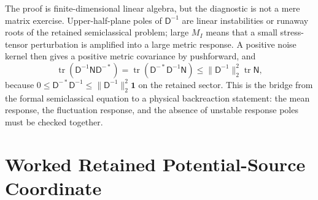 The proof is finite-dimensional linear algebra, but the diagnostic is not a
mere matrix exercise.  Upper-half-plane poles of \(\mathsf D^{-1}\) are
linear instabilities or runaway roots of the retained semiclassical problem;
large \(M_I\) means that a small stress-tensor perturbation is amplified into
a large metric response.  A positive noise kernel then gives a positive
metric covariance by pushforward, and
\[
  \operatorname{tr}(\mathsf D^{-1}\mathsf N\mathsf D^{-*})
  =
  \operatorname{tr}(\mathsf D^{-*}\mathsf D^{-1}\mathsf N)
  \le
  \lVert \mathsf D^{-1}\rVert_2^2\operatorname{tr}\mathsf N ,
\]
because \(0\le \mathsf D^{-*}\mathsf D^{-1}\le
\lVert\mathsf D^{-1}\rVert_2^2\mathbf 1\) on the retained sector.  This is
the bridge from the formal semiclassical equation to a physical
backreaction statement: the mean response, the fluctuation response, and the
absence of unstable response poles must be checked together.

\section{Worked Retained Potential-Source Coordinate}
\label{sec:semiclassical-worked-interacting-source-shift}

